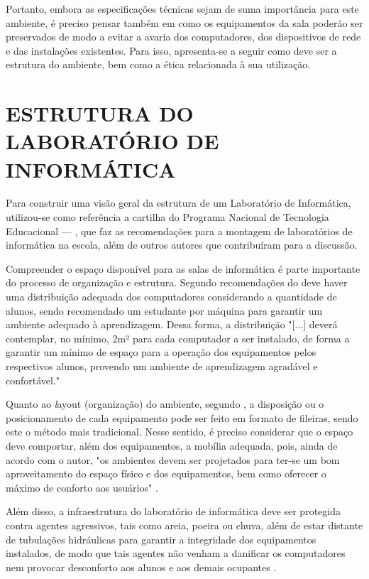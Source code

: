 \documentclass[12pt, openright, oneside, a4paper, brazil]{abntex2}
\begin{document}
Portanto, embora as especificações técnicas sejam de suma importância para este ambiente, é preciso pensar também em como os equipamentos da sala poderão ser preservados de modo a evitar a avaria dos computadores, dos dispositivos de rede e das instalações existentes. Para isso, apresenta-se a seguir como deve ser a estrutura do ambiente, bem como a ética relacionada à sua utilização.

\section{ESTRUTURA DO LABORATÓRIO DE INFORMÁTICA}

	Para construir uma visão geral da estrutura de um Laboratório de Informática, utilizou-se como referência a cartilha do Programa Nacional de Tecnologia Educacional — , que faz as recomendações para a montagem de laboratórios de informática na escola, além de outros autores que contribuíram para a discussão.

Compreender o espaço disponível para as salas de informática é parte importante do processo de organização e estrutura. Segundo recomendações do  deve haver uma distribuição adequada dos computadores considerando a quantidade de alunos, sendo recomendado um estudante por máquina para garantir um ambiente adequado à aprendizagem. Dessa forma, a distribuição "[...] deverá contemplar, no mínimo, 2m² para cada computador a ser instalado, de forma a garantir um mínimo de espaço para a operação dos equipamentos pelos respectivos alunos, provendo um ambiente de aprendizagem agradável e confortável."

	Quanto ao {\textit layout} (organização) do ambiente, segundo , a disposição ou o posicionamento de cada equipamento pode ser feito em formato de fileiras, sendo este o método mais tradicional. Nesse sentido, é preciso considerar que o espaço deve comportar, além dos equipamentos, a mobília adequada, pois, ainda de acordo com o autor, "os ambientes devem ser projetados para ter-se um bom aproveitamento do espaço físico e dos equipamentos, bem como oferecer o máximo de conforto aos usuários" \cite[p.~114]{gripa2002}.

	Além disso, a infraestrutura do laboratório de informática deve ser protegida contra agentes agressivos, tais como areia, poeira ou chuva, além de estar distante de tubulações hidráulicas para garantir a integridade dos equipamentos instalados, de modo que tais agentes não venham a danificar os computadores nem provocar desconforto aos alunos e aos demais ocupantes \cite{proinfo2009}.
\end{document}
